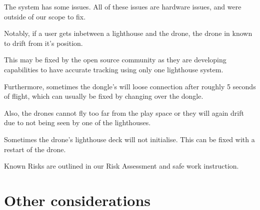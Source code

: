 \documentclass{article}
\begin{document}
  The system has some issues. All of these issues are hardware issues, and were
  outside of our scope to fix.

  Notably, if a user gets inbetween a lighthouse
  and the drone, the drone in known to drift from it's position.

  This may be fixed by the open source community as they are developing capabilities
  to have accurate tracking using only one lighthouse system.

  Furthermore, sometimes the dongle's will loose connection after roughly 5 seconds
  of flight, which can usually be fixed by changing over the dongle.

  Also, the drones cannot fly too far from the play space or they will again
  drift due to not being seen by one of the lighthouses.

  Sometimes the drone's lighthouse deck will not initialise. This can be fixed
  with a restart of the drone.

  Known Risks are outlined in our Risk Assessment and safe work instruction.

  \section {Other considerations}
  
\end{document}
